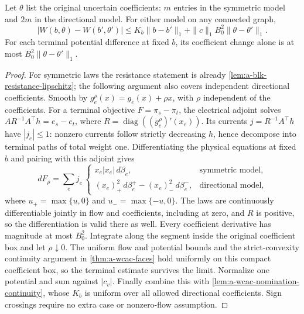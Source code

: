 \begin{lemma}
\label{lem:a-wcac-coefficient-continuity}
Let $\theta$ list the original uncertain coefficients: $m$ entries in the
symmetric model and $2m$ in the directional model. For either model on
any connected graph,
\begin{equation}
 |W(b,\theta)-W(b',\theta')|
 \le K_b\|b-b'\|_1+\|c\|_1B_0^2\|\theta-\theta'\|_1.
 \label{eq:a-wcac-joint-continuity}
\end{equation}
For each terminal potential difference at fixed $b$, its coefficient
change alone is at most $B_0^2\|\theta-\theta'\|_1$.
\end{lemma}
\begin{proof}
For symmetric laws the resistance statement is already
\cref{lem:a-blk-resistance-lipschitz}; the following argument also covers
independent directional coefficients. Smooth by $g_e^\rho(x)=g_e(x)+\rho x$,
with $\rho$ independent of the coefficients. For a terminal objective
$F=\pi_s-\pi_t$, the electrical adjoint solves
$A R^{-1}A^\top h=e_s-e_t$, where
$R=\operatorname{diag}((g_e^\rho)'(x_e))$. Its currents
$j=R^{-1}A^\top h$ have $|j_e|\le1$: nonzero currents follow strictly
decreasing $h$, hence decompose into terminal paths of total weight one.
Differentiating the physical equations at fixed $b$ and pairing with
this adjoint gives
\[
 dF_\rho=\sum_e j_e\,
 \begin{cases}
 x_e|x_e|\,d\beta_e,&\text{symmetric model},\\
 (x_e)_+^2\,d\beta_e^+-(x_e)_-^2\,d\beta_e^-,
                                      &\text{directional model},
 \end{cases}
\]
where $u_+=\max\{u,0\}$ and $u_-=\max\{-u,0\}$. The laws are continuously
differentiable jointly in flow and coefficients, including at zero, and
$R$ is positive, so the differentiation is valid there as well. Every
coefficient derivative has magnitude at most $B_0^2$. Integrate along
the segment inside the original coefficient box and let $\rho\downarrow0$.
The uniform flow and potential bounds and the strict-convexity continuity
argument in \cref{thm:a-wcac-faces} hold uniformly on this compact
coefficient box, so the terminal estimate survives the limit. Normalize
one potential and sum against $|c_v|$. Finally combine this with
\cref{lem:a-wcac-nomination-continuity}, whose $K_b$ is uniform over all
allowed directional coefficients. Sign crossings require no extra case
or nonzero-flow assumption.
\end{proof}

